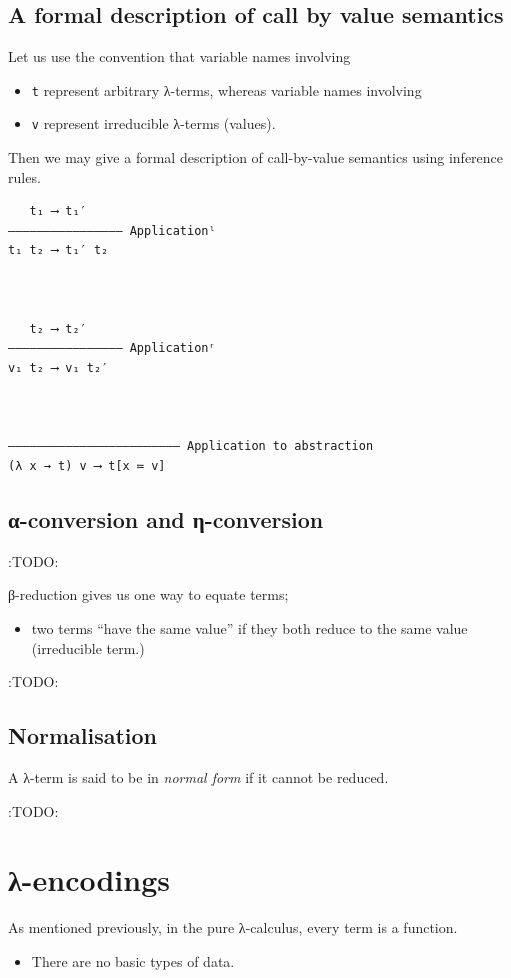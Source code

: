 \documentclass[11pt]{article}
\theoremstyle{definition}
\begin{document}
\subsection{A formal description of call by value semantics}
\label{sec:org792090e}

Let us use the convention that variable names involving
\begin{itemize}
\item \texttt{t} represent arbitrary λ-terms, whereas variable names involving
\item \texttt{v} represent irreducible λ-terms (values).
\end{itemize}

Then we may give a formal description of call-by-value semantics
using inference rules.
\begin{verbatim}
   t₁ ⟶ t₁′
–––––––––––––––– Applicationˡ
t₁ t₂ ⟶ t₁′ t₂


   
   t₂ ⟶ t₂′
–––––––––––––––– Applicationʳ
v₁ t₂ ⟶ v₁ t₂′


   
–––––––––––––––––––––––– Application to abstraction
(λ x → t) v ⟶ t[x ≔ v]
\end{verbatim}

\subsection{α-conversion and η-conversion}
\label{sec:org37e8773}
:TODO:


β-reduction gives us one way to equate terms;
\begin{itemize}
\item two terms “have the same value” if they both reduce to the same
value (irreducible term.)
\end{itemize}

:TODO:

\subsection{Normalisation}
\label{sec:orgb5accb7}

A λ-term is said to be in \emph{normal form} if it cannot be reduced.

:TODO:

\section{λ-encodings}
\label{sec:org69b1c42}
As mentioned previously, in the pure λ-calculus,
every term is a function.
\begin{itemize}
\item There are no basic types of data.
\end{itemize}
\end{document}
